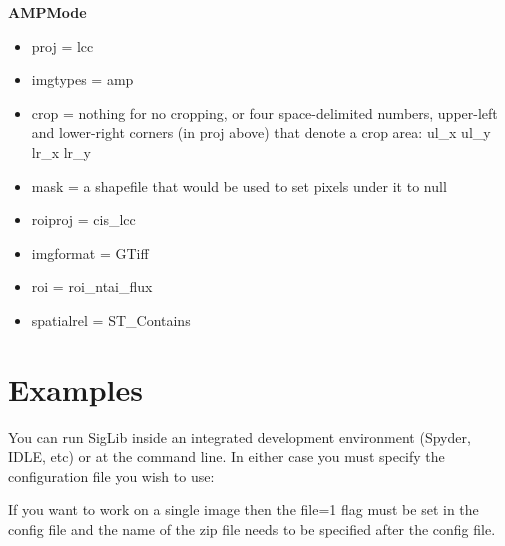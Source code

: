 \documentclass[letterpaper,10pt,english]{sphinxmanual}
\begin{document}
\textbf{AMPMode}
\begin{itemize}
\item {} 
proj = lcc

\item {} 
imgtypes = amp

\item {} 
crop = nothing for no cropping, or four space-delimited numbers,
upper-left and lower-right corners (in proj above) that denote a crop
area: ul\_x ul\_y lr\_x lr\_y

\item {} 
mask = a shapefile that would be used to set pixels under it to null

\item {} 
roiproj = cis\_lcc

\item {} 
imgformat = GTiff

\item {} 
roi = roi\_ntai\_flux

\item {} 
spatialrel = ST\_Contains

\end{itemize}


\section{Examples}
\label{project:examples}
You can run SigLib inside an integrated development environment (Spyder,
IDLE, etc) or at the command line. In either case you must specify the
configuration file you wish to use:


If you want to work on a single image then the file=1 flag must be set
in the config file and the name of the zip file needs to be specified
after the config file.

\end{document}
